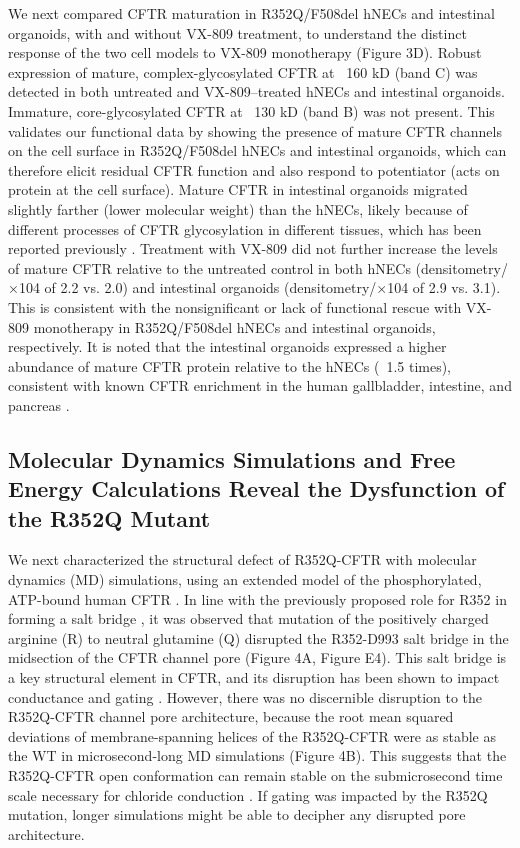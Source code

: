 We next compared CFTR maturation in R352Q/F508del hNECs and intestinal organoids, with and without VX-809 treatment, to understand the distinct response of the two cell models to VX-809 monotherapy (Figure 3D). Robust expression of mature, complex-glycosylated CFTR at ~160 kD (band C) was detected in both untreated and VX-809–treated hNECs and intestinal organoids. Immature, core-glycosylated CFTR at ~130 kD (band B) was not present. This validates our functional data by showing the presence of mature CFTR channels on the cell surface in R352Q/F508del hNECs and intestinal organoids, which can therefore elicit residual CFTR function and also respond to potentiator (acts on protein at the cell surface). Mature CFTR in intestinal organoids migrated slightly farther (lower molecular weight) than the hNECs, likely because of different processes of CFTR glycosylation in different tissues, which has been reported previously \cite{vanbarneveld2010}. Treatment with VX-809 did not further increase the levels of mature CFTR relative to the untreated control in both hNECs (densitometry/×104 of 2.2 vs. 2.0) and intestinal organoids (densitometry/×104 of 2.9 vs. 3.1). This is consistent with the nonsignificant or lack of functional rescue with VX-809 monotherapy in R352Q/F508del hNECs and intestinal organoids, respectively. It is noted that the intestinal organoids expressed a higher abundance of mature CFTR protein relative to the hNECs (~1.5 times), consistent with known CFTR enrichment in the human gallbladder, intestine, and pancreas \cite{human_protein_atlas_2021, uhlen2015}.

\subsection{Molecular Dynamics Simulations and Free Energy Calculations Reveal the Dysfunction of the R352Q Mutant}


We next characterized the structural defect of R352Q-CFTR with molecular dynamics (MD) simulations, using an extended model of the phosphorylated, ATP-bound human CFTR \cite{wong2022}. In line with the previously proposed role for R352 in forming a salt bridge \cite{cui2008}, it was observed that mutation of the positively charged arginine (R) to neutral glutamine (Q) disrupted the R352-D993 salt bridge in the midsection of the CFTR channel pore (Figure 4A, Figure E4). This salt bridge is a key structural element in CFTR, and its disruption has been shown to impact conductance and gating \cite{cui2008}. However, there was no discernible disruption to the R352Q-CFTR channel pore architecture, because the root mean squared deviations of membrane-spanning helices of the R352Q-CFTR were as stable as the WT in microsecond-long MD simulations (Figure 4B). This suggests that the R352Q-CFTR open conformation can remain stable on the submicrosecond time scale necessary for chloride conduction \cite{sorum2015}. If gating was impacted by the R352Q mutation, longer simulations might be able to decipher any disrupted pore architecture.

